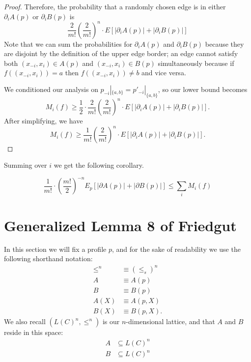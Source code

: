 \begin{proof}
		Therefore, the probability that a randomly chosen edge is in either $\partial_i A(p)$ or $\partial_i B(p)$ is
		\[
			\frac{2}{m!} \left(\frac{2}{m!}\right)^{n} \cdot E \left[ |\partial_i A(p)| + |\partial_i B(p)| \right]
		\]
		Note that we can sum the probabilities for $\partial_i A(p)$ and $\partial_i B(p)$ because they are disjoint by the definition of the upper edge border; an edge cannot satisfy both $(x_{-i}, x_i) \in A(p)$ and $(x_{-i}, x_i) \in B(p)$ simultaneously because if $f((x_{-i}, x_i)) = a$ then $f((x_{-i}, x_i)) \ne b$ and vice versa.

		We conditioned our analysis on $p_{-i}|_{\{a,b\}} = p'_{-i}|_{\{a,b\}}$, so our lower bound becomes
		\[
			M_i(f) \ge \frac{1}{2} \cdot \frac{2}{m!}\left(\frac{2}{m!}\right)^{n} \cdot E \left[ |\partial_i A(p)| + |\partial_i B(p)| \right].
		\]
		After simplifying, we have
		\[
			M_i(f) \ge \frac{1}{m!}\left(\frac{2}{m!}\right)^{n} \cdot E \left[ |\partial_i A(p)| + |\partial_i B(p)| \right].
		\]
	\end{proof}

	Summing over $i$ we get the following corollary.

	\begin{corollary}
		\[
			\frac{1}{m!} \cdot \left(\frac{m!}{2}\right)^{-n} E_p[|\partial A(p)| + |\partial B(p)|] \le \sum_i M_i(f)
		\]
	\end{corollary}


\section{Generalized Lemma 8 of Friedgut}

	In this section we will fix a profile $p$, and for the sake of readability we use the following shorthand notation:
	\begin{align*}
		\le^n &\equiv (\le_s)^n \\
		A &\equiv A(p) \\
		B &\equiv B(p) \\
		A(X) &\equiv A(p, X) \\
		B(X) &\equiv B(p, X).
	\end{align*}
	We also recall $(L(C)^n, \le^n)$ is our $n$-dimensional lattice, and that $A$ and $B$ reside in this space:
	\begin{align*}
		A &\subseteq L(C)^n \\
		B &\subseteq L(C)^n \\
	\end{align*}

